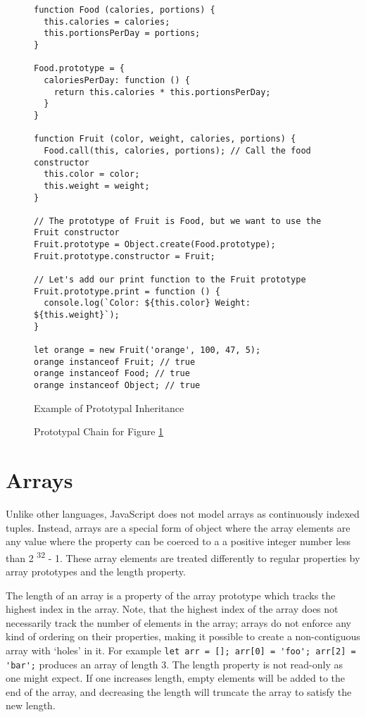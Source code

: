 \documentclass[]{final_report}
\begin{document}
\begin{figure}[t]
\begin{verbatim}
function Food (calories, portions) {
  this.calories = calories;
  this.portionsPerDay = portions;
}

Food.prototype = {
  caloriesPerDay: function () {
    return this.calories * this.portionsPerDay;
  }
}

function Fruit (color, weight, calories, portions) {
  Food.call(this, calories, portions); // Call the food constructor
  this.color = color;
  this.weight = weight;
}

// The prototype of Fruit is Food, but we want to use the Fruit constructor
Fruit.prototype = Object.create(Food.prototype);
Fruit.prototype.constructor = Fruit;

// Let's add our print function to the Fruit prototype
Fruit.prototype.print = function () {
  console.log(`Color: ${this.color} Weight: ${this.weight}`);
}

let orange = new Fruit('orange', 100, 47, 5);
orange instanceof Fruit; // true
orange instanceof Food; // true
orange instanceof Object; // true
\end{verbatim}
\caption{\label{fig:js-prototypal-inheritance} Example of Prototypal Inheritance}
\end{figure} 

\begin{figure}[t]
\centering
\fboxsep 2mm
\caption{\label{fig:js-prototypal-chain} Prototypal Chain for Figure \ref{fig:js-prototypal-inheritance}}
\end{figure} 

\section{Arrays} \label{sec:arrays}
Unlike other languages, JavaScript does not model arrays as continuously indexed tuples. Instead, arrays are a special form of object where the array elements are any value where the property can be coerced to a a positive integer number less than 2 \textsuperscript{32} - 1. These array elements are treated differently to regular properties by array prototypes and the length property. 

The length of an array is a property of the array prototype which tracks the highest index in the array. Note, that the highest index of the array does not necessarily track the number of elements in the array; arrays do not enforce any kind of ordering on their properties, making it possible to create a non-contiguous array with `holes' in it. For example \lstinline|let arr = []; arr[0] = 'foo'; arr[2] = 'bar';| produces an array of length 3. The length property is not read-only as one might expect. If one increases length, empty elements will be added to the end of the array, and decreasing the length will truncate the array to satisfy the new length.
\end{document}
